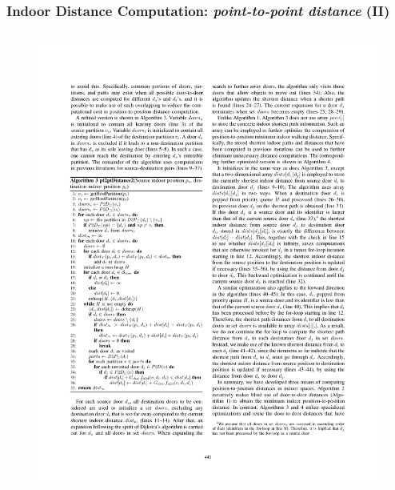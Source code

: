 \begin{frame}
\frametitle{Indoor Distance Computation: \emph{point-to-point distance} (II)}

\begin{columns}[c]

  \begin{figure}[tb]
    \includegraphics[width=\columnwidth]{figures/2-5/2-5-5.pdf}
  \end{figure}



\end{columns}

\end{frame}


%
%
%
%
%
%
%
